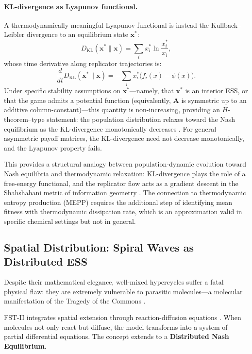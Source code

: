 \documentclass[12pt,a4paper]{article}
\theoremstyle{remark}
\begin{document}
\paragraph{KL-divergence as Lyapunov functional.}
A thermodynamically meaningful Lyapunov functional is instead the Kullback--Leibler divergence to an equilibrium state $\mathbf{x}^*$:
\begin{equation}
D_{\mathrm{KL}}(\mathbf{x}^* \| \mathbf{x}) = \sum_i x_i^* \ln \frac{x_i^*}{x_i},
\end{equation}
whose time derivative along replicator trajectories is:
\begin{equation}
\frac{d}{dt} D_{\mathrm{KL}}(\mathbf{x}^* \| \mathbf{x}) = -\sum_i x_i^* \big(f_i(x) - \phi(x)\big).
\end{equation}
Under specific stability assumptions on $\mathbf{x}^*$---namely, that $\mathbf{x}^*$ is an interior ESS, or that the game admits a potential function (equivalently, $\mathbf{A}$ is symmetric up to an additive column-constant)---this quantity is non-increasing, providing an $H$-theorem--type statement: the population distribution relaxes toward the Nash equilibrium as the KL-divergence monotonically decreases \citep{HofbauerSigmund1998,ReplicatorEntropy}. For general asymmetric payoff matrices, the KL-divergence need not decrease monotonically, and the Lyapunov property fails.

This provides a structural analogy between population-dynamic evolution toward Nash equilibria and thermodynamic relaxation: KL-divergence plays the role of a free-energy functional, and the replicator flow acts as a gradient descent in the Shahshahani metric of information geometry \citep{ReplicatorEntropy}. The connection to thermodynamic entropy production (MEPP) requires the additional step of identifying mean fitness with thermodynamic dissipation rate, which is an approximation valid in specific chemical settings but not in general.

\subsection{Spatial Distribution: Spiral Waves as Distributed ESS}

Despite their mathematical elegance, well-mixed hypercycles suffer a fatal physical flaw: they are extremely vulnerable to parasitic molecules---a molecular manifestation of the Tragedy of the Commons \citep{HypercycleInfinite}.

FST-II integrates spatial extension through reaction-diffusion equations \citep{ReplicatorDiffusion}. When molecules not only react but diffuse, the model transforms into a system of partial differential equations. The concept extends to a \textbf{Distributed Nash Equilibrium}.
\end{document}
